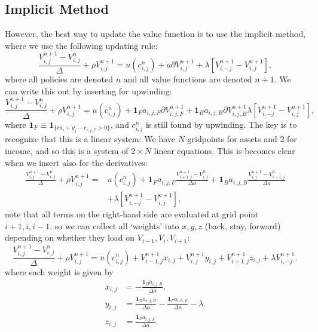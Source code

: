 \documentclass[12pt]{article}
\DeclareMathOperator{\1}{\mathbbm{1}}
\begin{document}
\subsection{Implicit Method}\label{sec:implicitmethod}
However, the best way to update the value function is to use the implicit method, where we use the following updating rule:
\begin{equation}
\frac{V^{n+1}_{i,j} - V^n_{i,j}}\Delta + \rho V^{n+1}_{i,j} =u(c^n_{i,j}) + \dot a \partial V^{n+1}_{i,j} + \lambda [V^{n+1}_{i,-j} - V^{n+1}_{i,j}],
\end{equation}
where all policies are denoted $n$ and all value functions are denoted $n+1$. We can write this out by inserting for upwinding:
\begin{equation}
\frac{V^{n+1}_{i,j} - V^n_{i,j}}{\Delta} +  \rho V^{n+1}_{i,j} =u(c^n_{i,j}) + \mathbf{1}_F\dot a_{i,j,F} \partial V^{n+1}_{i,j,F} + \mathbf{1}_B \dot a_{i,j,B} \partial V^{n+1}_{i,j,B} \lambda [V^{n+1}_{i,-j} - V^{n+1}_{i,j}],
\end{equation}
where $\mathbf{1}_F \equiv \mathbf{1}_{\{ra_i + y_j - c_{i,j,F}>0\}}$, and  $c^n_{i,j}$ is still found by upwinding. The key is to recognize that this is a linear system: We have $N$ gridpoints for assets and $2$ for income, and so this is a system of $2\times N$ linear equations. This is becomes clear when we insert also for the derivatives:
\begin{equation}
\begin{split}
\frac{V^{n+1}_{i,j} - V^n_{i,j}}{\Delta} +  \rho V^{n+1}_{i,j} =&u(c^n_{i,j}) + \mathbf{1}_F\dot a_{i,j,F} \frac{V^{n+1}_{i+1,j} - V^{n,}_{i,j}}{\Delta a } + \mathbf{1}_B \dot a_{i,j,B} \frac{V^{n+1}_{i,j} - V^{n,}_{i-1,j}}{\Delta a}  \\
 & + \lambda [V^{n+1}_{i,-j} - V^{n+1}_{i,j}],
\end{split}
\end{equation}
note that all terms on the right-hand side are evaluated at grid point $i+1,i,i-1$, so we can collect all `weights' into $x,y,z$ (back, stay, forward)  depending on whether they load on $V_{i-1},V_i,V_{i+1}$:
\begin{equation}\label{eq:systemeq}
\frac{V^{n+1}_{i,j} - V^n_{i,j}}{\Delta} +  \rho V^{n+1}_{i,j} =u(c^n_{i,j}) + V^{n+1}_{i-1,j}x_{i,j} + V^{n+1}_{i,j}y_{i,j} + V^{n+1}_{i+1,j}z_{i,j}
 + \lambda V^{n+1}_{i,-j},
\end{equation}
where each weight is given by
\begin{align*}
x_{i,j} &=  -\frac{\mathbf{1}_B \dot a_{i,j,B}}{\Delta a}. \\
y_{i,j} &=  \frac{\mathbf{1}_B \dot a_{i,j,B}}{\Delta a} -\frac{\mathbf{1}_F \dot a_{i,h,F}}{\Delta a} - \lambda. \\
z_{i,j} &= \frac{\mathbf{1}_F \dot a_{i,j,F}}{\Delta a}.
\end{align*}
\end{document}
